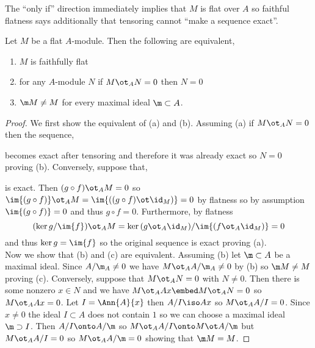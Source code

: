 \documentclass[12pt]{article}
\begin{document}
\begin{rmk}
The ``only if'' direction immediately implies that $M$ is flat over $A$ so faithful flatness says additionally that tensoring cannot ``make a sequence exact''. 
\end{rmk}

\begin{lemma}
Let $M$ be a flat $A$-module. Then the following are equivalent,
\begin{enumerate}
\item $M$ is faithfully flat
\item for any $A$-module $N$ if $M \ot_A N = 0$ then $N = 0$
\item $\m M \neq M$ for every maximal ideal $\m \subset A$.
\end{enumerate}
\end{lemma}

\begin{proof}
We first show the equivalent of (a) and (b). Assuming (a) if $M \ot_A N = 0$ then the sequence,
\begin{center}
\end{center}
becomes exact after tensoring and therefore it was already exact so $N = 0$ proving (b). Conversely, suppose that,
\begin{center}
\end{center}
is exact. Then $(g \circ f) \ot_A M = 0$ so $\im{(g \circ f)} \ot_A M = \im{((g \circ f) \ot \id_M)} = 0$ by flatness so by assumption $\im{(g \circ f)} = 0$ and thus $g \circ f = 0$. Furthermore, by flatness
\[ (\ker{g} / \im{f}) \ot_A M = \ker{(g \ot_A \id_M)} / \im{(f \ot_A \id_M)} = 0 \] 
and thus $\ker{g} = \im{f}$ so the original sequence is exact proving (a). 
\bigskip\\
Now we show that (b) and (c) are equivalent. Assuming (b) let $\m \subset A$ be a maximal ideal. Since $A / \m_A \neq 0$ we have $M \ot_A A / \m_A \neq 0$ by (b) so $\m M \neq M$ proving (c). Conversely, suppose that $M \ot_A N = 0$ with $N \neq 0$. Then there is some nonzero $x \in N$ and we have $M \ot_A Ax \embed M \ot_A N = 0$ so $M \ot_A Ax = 0$. Let $I = \Ann{A}{x}$ then $A / I \iso A x$ so $M \ot_A A/I = 0$. Since $x \neq 0$ the ideal $I \subset A$ does not contain $1$ so we can choose a maximal ideal $\m \supset I$. Then $A/I \onto A / \m$ so $M \ot_A A/I \onto M \ot A / \m$ but $M \ot_A A/I = 0$ so $M \ot_A A / \m = 0$ showing that $\m M = M$.
\end{proof}
\end{document}
